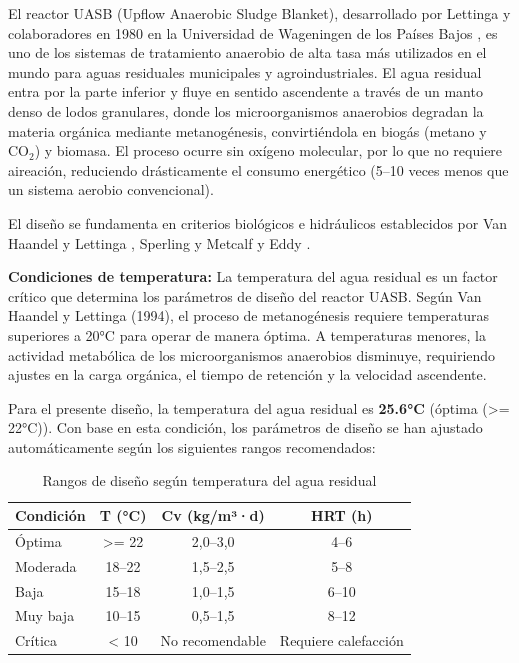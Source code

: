 \documentclass[12pt,a4paper]{article}
\begin{document}
El reactor UASB (Upflow Anaerobic Sludge Blanket), desarrollado por Lettinga y colaboradores en 1980 en la Universidad de Wageningen de los Países Bajos \cite{vanhaandel1994}, es uno de los sistemas de tratamiento anaerobio de alta tasa más utilizados en el mundo para aguas residuales municipales y agroindustriales. El agua residual entra por la parte inferior y fluye en sentido ascendente a través de un manto denso de lodos granulares, donde los microorganismos anaerobios degradan la materia orgánica mediante metanogénesis, convirtiéndola en biogás (metano y CO$_2$) y biomasa. El proceso ocurre sin oxígeno molecular, por lo que no requiere aireación, reduciendo drásticamente el consumo energético (5--10 veces menos que un sistema aerobio convencional).

El diseño se fundamenta en criterios biológicos e hidráulicos establecidos por Van Haandel y Lettinga \cite{vanhaandel1994}, Sperling \cite{sperling2007} y Metcalf y Eddy \cite{metcalf2014}.

\textbf{Condiciones de temperatura:} La temperatura del agua residual es un factor crítico que determina los parámetros de diseño del reactor UASB. Según Van Haandel y Lettinga (1994), el proceso de metanogénesis requiere temperaturas superiores a 20°C para operar de manera óptima. A temperaturas menores, la actividad metabólica de los microorganismos anaerobios disminuye, requiriendo ajustes en la carga orgánica, el tiempo de retención y la velocidad ascendente.

Para el presente diseño, la temperatura del agua residual es \textbf{25.6°C} (óptima (>= 22°C)). Con base en esta condición, los parámetros de diseño se han ajustado automáticamente según los siguientes rangos recomendados:

\begin{table}[H]
\centering
\caption{Rangos de diseño según temperatura del agua residual}
\small
\begin{tabular}{lccc}
\toprule
\textbf{Condición} & \textbf{T (°C)} & \textbf{Cv (kg/m³·d)} & \textbf{HRT (h)} \\
\midrule
Óptima & >= 22 & 2,0--3,0 & 4--6 \\
Moderada & 18--22 & 1,5--2,5 & 5--8 \\
Baja & 15--18 & 1,0--1,5 & 6--10 \\
Muy baja & 10--15 & 0,5--1,5 & 8--12 \\
Crítica & < 10 & No recomendable & Requiere calefacción \\
\bottomrule
\end{tabular}
\end{table}
\end{document}
